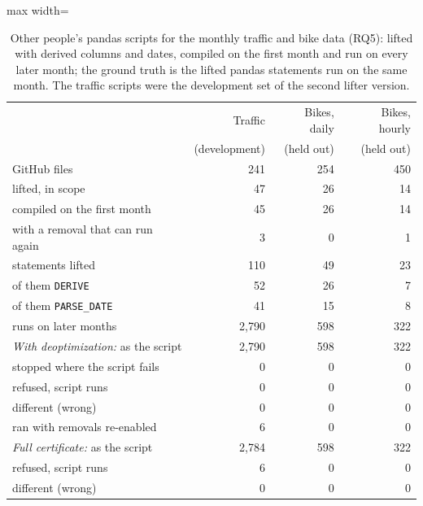 \begin{table}[t]
\caption{Other people's pandas scripts for the monthly traffic and bike data (RQ5): lifted with derived columns and dates, compiled on the first month and run on every later month; the ground truth is the lifted pandas statements run on the same month. The traffic scripts were the development set of the second lifter version.}
\label{tab:rq-drift}
\centering
\footnotesize
\setlength{\tabcolsep}{4pt}
\begin{adjustbox}{max width=\linewidth}
\begin{tabular}{@{}lrrr@{}}
\toprule
 & Traffic & Bikes, daily & Bikes, hourly \\
 & (development) & (held out) & (held out) \\
\midrule
GitHub files & 241 & 254 & 450 \\
lifted, in scope & 47 & 26 & 14 \\
compiled on the first month & 45 & 26 & 14 \\
\quad with a removal that can run again & 3 & 0 & 1 \\
statements lifted & 110 & 49 & 23 \\
\quad of them \texttt{DERIVE} & 52 & 26 & 7 \\
\quad of them \texttt{PARSE\_DATE} & 41 & 15 & 8 \\
runs on later months & 2,790 & 598 & 322 \\
\emph{With deoptimization:} as the script & 2,790 & 598 & 322 \\
\quad stopped where the script fails & 0 & 0 & 0 \\
\quad refused, script runs & 0 & 0 & 0 \\
\quad different (wrong) & 0 & 0 & 0 \\
\quad ran with removals re-enabled & 6 & 0 & 0 \\
\emph{Full certificate:} as the script & 2,784 & 598 & 322 \\
\quad refused, script runs & 6 & 0 & 0 \\
\quad different (wrong) & 0 & 0 & 0 \\
\bottomrule
\end{tabular}
\end{adjustbox}
\end{table}
